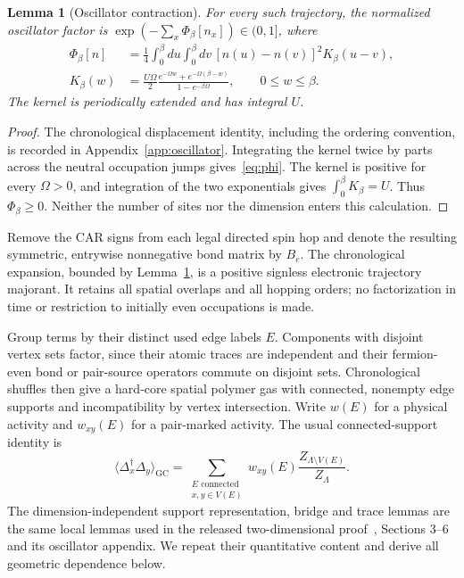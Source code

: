 \documentclass[11pt]{article}
\theoremstyle{plain}
\newtheorem{lemma}{Lemma}
\theoremstyle{remark}
\newcommand{\GC}{\mathrm{GC}}
\begin{document}
\begin{lemma}[Oscillator contraction]\label{lem:phonon}
For every such trajectory, the normalized oscillator factor is
$\exp(-\sum_x\Phi_\beta[n_x])\in(0,1]$, where
\begin{align}
\Phi_\beta[n]&=\frac14\int_0^\beta\!du\int_0^\beta\!dv\,
[n(u)-n(v)]^2K_\beta(u-v),\label{eq:phi}\\
K_\beta(w)&=\frac{U\Omega}{2}
\frac{e^{-\Omega w}+e^{-\Omega(\beta-w)}}{1-e^{-\beta\Omega}},
\qquad 0\le w\le\beta.\label{eq:kernel}
\end{align}
The kernel is periodically extended and has integral $U$.
\end{lemma}
\begin{proof}
The chronological displacement identity, including the ordering convention,
is recorded in Appendix~\ref{app:oscillator}. Integrating the kernel twice by
parts across the neutral occupation jumps gives~\eqref{eq:phi}.
The kernel is positive for every $\Omega>0$, and integration of the two
exponentials gives $\int_0^\beta K_\beta=U$. Thus $\Phi_\beta\ge0$.
Neither the number of sites nor the dimension enters this calculation.
\end{proof}

Remove the CAR signs from each legal directed spin hop and denote the
resulting symmetric, entrywise nonnegative bond matrix by $B_e$.
The chronological expansion, bounded by Lemma~\ref{lem:phonon}, is a positive
signless electronic trajectory majorant. It retains all spatial overlaps and
all hopping orders; no factorization in time or restriction to initially
even occupations is made.

Group terms by their distinct used edge labels $E$. Components with disjoint
vertex sets factor, since their atomic traces are independent and their
fermion-even bond or pair-source operators commute on disjoint sets.
Chronological shuffles then give a hard-core spatial polymer gas with
connected, nonempty edge supports and incompatibility by vertex intersection.
Write $w(E)$ for a physical activity and $w_{xy}(E)$ for a pair-marked activity.
The usual connected-support identity is
\begin{equation}\label{eq:pairpolymer}
\langle\Delta_x^\dagger\Delta_y\rangle_\GC
=\sum_{\substack{E\text{ connected}\\x,y\in V(E)}}
w_{xy}(E)\frac{Z_{\Lambda\setminus V(E)}}{Z_\Lambda}.
\end{equation}
The dimension-independent support representation, bridge and trace lemmas
are the same local lemmas used in the released two-dimensional
proof~\cite{rensSharp}, Sections 3--6 and its oscillator appendix.
We repeat their quantitative content and derive all geometric dependence below.
\end{document}
